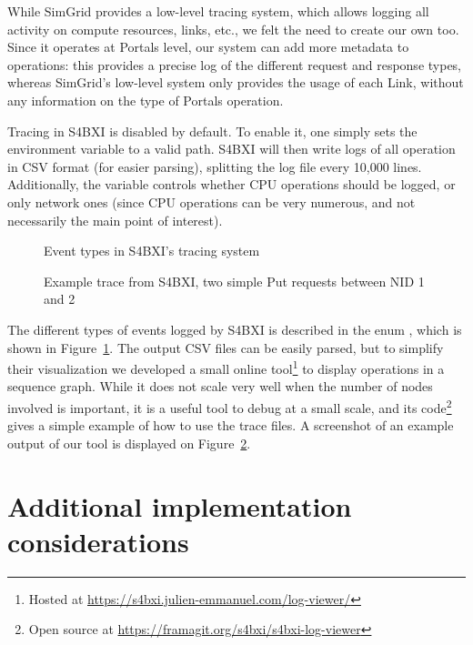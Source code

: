 While SimGrid provides a low-level tracing system, which allows logging all
activity on compute resources, links, etc., we felt the need to create our own
too. Since it operates at Portals level, our system can add more metadata to
operations: this provides a precise log of the different request and response
types, whereas SimGrid's low-level system only provides the usage of each Link,
without any information on the type of Portals operation.

Tracing in S4BXI is disabled by default. To enable it, one simply sets the
environment variable  to a valid path. S4BXI will
then write logs of all operation in CSV format (for easier parsing), splitting
the log file every 10,000 lines. Additionally, the variable
 controls whether CPU operations should be
logged, or only network ones (since CPU operations can be very numerous, and not
necessarily the main point of interest).

\begin{figure}[!ht]
    
    \caption{Event types in S4BXI's tracing system}
    \label{fig:4_portals:bxi_log_type}
\end{figure}

\begin{figure}[!ht]
    \centering
    \caption{Example trace from S4BXI, two simple Put requests between NID 1 and 2}
    \label{fig:4_portals:S4BXI_trace}
\end{figure}

The different types of events logged by S4BXI is described in the enum
, which is shown in
Figure~\ref{fig:4_portals:bxi_log_type}. The output CSV files can be easily
parsed, but to simplify their visualization we developed a small online
tool\footnote{Hosted at \url{https://s4bxi.julien-emmanuel.com/log-viewer/}} to
display operations in a sequence graph. While it does not scale very well when
the number of nodes involved is important, it is a useful tool to debug at a
small scale, and its code\footnote{Open source at
\url{https://framagit.org/s4bxi/s4bxi-log-viewer}} gives a simple example of how
to use the trace files. A screenshot of an example output of our tool is
displayed on Figure~\ref{fig:4_portals:S4BXI_trace}.

\section{Additional implementation considerations}

